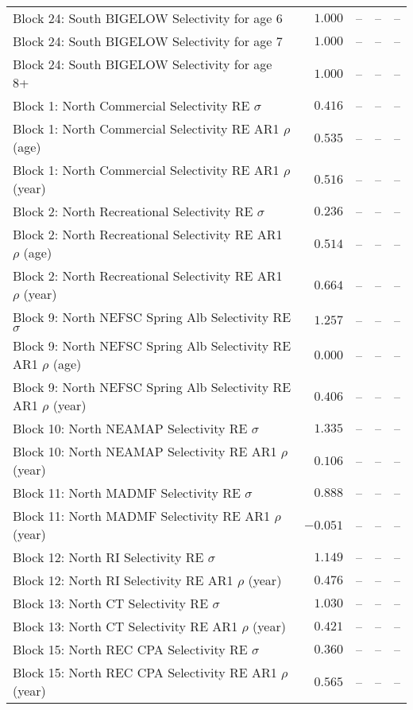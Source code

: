 \documentclass[
]{article}
\begin{document}
\begin{landscape}
\begin{longtable}[t]{lrrrr}
Block 24: South BIGELOW Selectivity for age 6 & $1.000$ & -- & -- & --\\
Block 24: South BIGELOW Selectivity for age 7 & $1.000$ & -- & -- & --\\
Block 24: South BIGELOW Selectivity for age 8+ & $1.000$ & -- & -- & --\\
Block 1: North Commercial Selectivity RE $\sigma$ & $0.416$ & -- & -- & --\\
\addlinespace
Block 1: North Commercial Selectivity RE AR1 $\rho$ (age) & $0.535$ & -- & -- & --\\
Block 1: North Commercial Selectivity RE AR1 $\rho$ (year) & $0.516$ & -- & -- & --\\
Block 2: North Recreational Selectivity RE $\sigma$ & $0.236$ & -- & -- & --\\
Block 2: North Recreational Selectivity RE AR1 $\rho$ (age) & $0.514$ & -- & -- & --\\
Block 2: North Recreational Selectivity RE AR1 $\rho$ (year) & $0.664$ & -- & -- & --\\
\addlinespace
Block 9: North NEFSC Spring Alb Selectivity RE $\sigma$ & $1.257$ & -- & -- & --\\
Block 9: North NEFSC Spring Alb Selectivity RE AR1 $\rho$ (age) & $0.000$ & -- & -- & --\\
Block 9: North NEFSC Spring Alb Selectivity RE AR1 $\rho$ (year) & $0.406$ & -- & -- & --\\
Block 10: North NEAMAP Selectivity RE $\sigma$ & $1.335$ & -- & -- & --\\
Block 10: North NEAMAP Selectivity RE AR1 $\rho$ (year) & $0.106$ & -- & -- & --\\
\addlinespace
Block 11: North MADMF Selectivity RE $\sigma$ & $0.888$ & -- & -- & --\\
Block 11: North MADMF Selectivity RE AR1 $\rho$ (year) & $-0.051$ & -- & -- & --\\
Block 12: North RI Selectivity RE $\sigma$ & $1.149$ & -- & -- & --\\
Block 12: North RI Selectivity RE AR1 $\rho$ (year) & $0.476$ & -- & -- & --\\
Block 13: North CT Selectivity RE $\sigma$ & $1.030$ & -- & -- & --\\
\addlinespace
Block 13: North CT Selectivity RE AR1 $\rho$ (year) & $0.421$ & -- & -- & --\\
Block 15: North REC CPA Selectivity RE $\sigma$ & $0.360$ & -- & -- & --\\
Block 15: North REC CPA Selectivity RE AR1 $\rho$ (year) & $0.565$ & -- & -- & --\\

\end{longtable}
\end{landscape}
\end{document}

